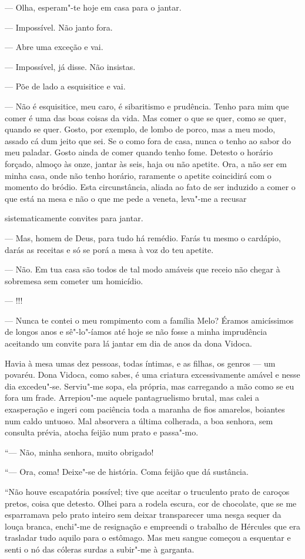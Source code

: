 --- Olha, esperam"-te hoje em casa para o jantar.

--- Impossível. Não janto fora.

--- Abre uma exceção e vai.

--- Impossível, já disse. Não insistas.

--- Põe de lado a esquisitice e vai.

--- Não é esquisitice, meu caro, é sibaritismo e prudência. Tenho para
mim que comer é uma das boas coisas da vida. Mas comer o que se quer,
como se quer, quando se quer. Gosto, por exemplo, de lombo de porco, mas
a meu modo, assado cá dum jeito que sei. Se o como fora de casa, nunca o
tenho ao sabor do meu paladar. Gosto ainda de comer quando tenho fome.
Detesto o horário forçado, almoço às onze, jantar às seis, haja ou não
apetite. Ora, a não ser em minha casa, onde não tenho horário, raramente
o apetite coincidirá com o momento do bródio. Esta circunstância, aliada
ao fato de ser induzido a comer o que está na mesa e não o que me pede a
veneta, leva"-me a recusar

sistematicamente convites para jantar.

--- Mas, homem de Deus, para tudo há remédio. Farás tu mesmo o cardápio,
darás as receitas e só se porá a mesa à voz do teu apetite.

--- Não. Em tua casa são todos de tal modo amáveis que receio não chegar
à sobremesa sem cometer um homicídio.

--- !!!

--- Nunca te contei o meu rompimento com a família Melo? Éramos
amicíssimos de longos anos e sê"-lo"-íamos até hoje se não fosse a minha
imprudência aceitando um convite para lá jantar em dia de anos da dona
Vidoca.

Havia à mesa umas dez pessoas, todas íntimas, e as filhas, os genros ---
um povaréu. Dona Vidoca, como sabes, é uma criatura excessivamente
amável e nesse dia excedeu"-se. Serviu"-me sopa, ela própria, mas
carregando a mão como se eu fora um frade. Arrepiou"-me aquele
pantagruelismo brutal, mas calei a exasperação e ingeri com paciência
toda a maranha de fios amarelos, boiantes num caldo untuoso. Mal
absorvera a última colherada, a boa senhora, sem consulta prévia, atocha
feijão num prato e passa"-mo.

``--- Não, minha senhora, muito obrigado!

``--- Ora, coma! Deixe"-se de história. Coma feijão que dá sustância.

``Não houve escapatória possível; tive que aceitar o truculento prato de
caroços pretos, coisa que detesto. Olhei para a rodela escura, cor de
chocolate, que se me esparramava pelo prato inteiro sem deixar
transparecer uma nesga sequer da louça branca, enchi"-me de resignação e
empreendi o trabalho de Hércules que era trasladar tudo aquilo para o
estômago. Mas meu sangue começou a esquentar e senti o nó das cóleras
surdas a subir"-me à garganta.


